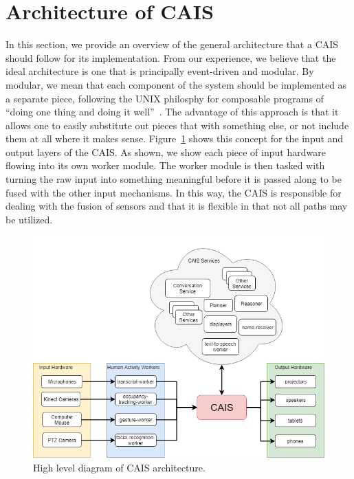 \section{Architecture of CAIS}\label{sec:cais_architecture}

In this section, we provide an overview of the general architecture that a
CAIS should follow for its implementation. From our experience, we believe
that the ideal architecture is one that is principally event-driven and
modular. By modular, we mean that each component of the system
should be implemented as a separate piece, following the UNIX philosphy for composable programs of 
``doing one thing and doing it well''~\cite{mcilroy_unix_1978}. The advantage of
this approach is that it allows one to easily substitute out pieces that with
something else, or not include them at all where it makes sense.
Figure~\ref{fig:cais_high_level} shows this concept for the input and output
layers of the CAIS. As shown, we show each piece of input hardware flowing
into its own worker module. The worker module is then tasked with turning the
raw input into something meaningful before it is passed along to be fused
with the other input mechanisms. In this way, the CAIS is responsible for
dealing with the fusion of sensors and that it is flexible in that not
all paths may be utilized.

\begin{figure}
    \centering
    \includegraphics[width=0.5\columnwidth]{chapters/02_technology/figures/cais_high_level.png}
    \caption{High level diagram of CAIS architecture.}
    \label{fig:cais_high_level}
\end{figure}

